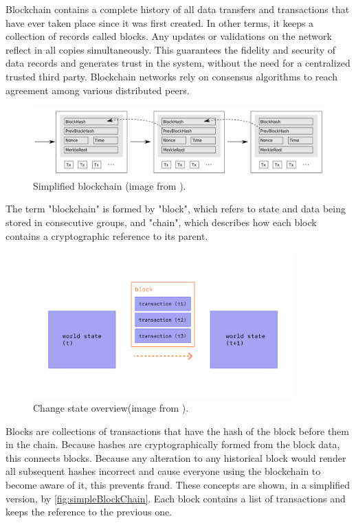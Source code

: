 Blockchain contains a complete history of all data transfers and transactions that have ever taken place since it was first created.
In other terms, it keeps a collection of records called blocks. 
Any updates or validations on the network reflect in all copies simultaneously. 
This guarantees the fidelity and security of data records and generates trust in the system, without the need for a centralized trusted third party.
Blockchain networks rely on consensus algorithms to reach agreement among various distributed peers.

\begin{figure}
    \centering
    \includegraphics[width=15cm]{logos/SimplifiedBlockChain.png}
    \caption{Simplified blockchain (image from \cite{BlockChain1}).}
    \label{fig:simpleBlockChain}
\end{figure}

The term "blockchain" is formed by "block", which refers to state and data being stored in consecutive groups, and "chain", 
which describes how each block contains a cryptographic reference to its parent. 
\begin{figure}
    \centering
    \includegraphics[width=10cm]{logos/tx-block.png}
    \caption{Change state overview(image from \cite{EthDocs}).}
    \label{fig:changeState}
\end{figure}

Blocks are collections of transactions that have the hash of the block before them in the chain.
Because hashes are cryptographically formed from the block data, this connects blocks.
Because any alteration to any historical block would render all subsequent hashes incorrect and cause 
everyone using the blockchain to become aware of it, this prevents fraud. 
These concepts are shown, in a simplified version, by \autoref{fig:simpleBlockChain}. 
Each block contains a list of transactions and keeps the reference to the previous one.

